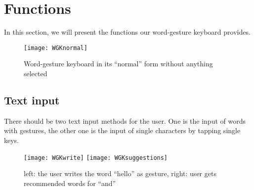 \section{Functions}
In this section, we will present the functions our word-gesture keyboard provides.
\begin{figure}
\centering
\texttt{[image: WGKnormal]}
\caption{Word-gesture keyboard in its ``normal'' form without anything selected}
\end{figure}
    
\subsection{Text input}
There should be two text input methods for the user. One is the input of words with gestures, the other one is the input of single characters by tapping single keys.

\begin{figure}
\centering
\texttt{[image: WGKwrite]}
\texttt{[image: WGKsuggestions]}
\caption{left: the user writes the word ``hello'' as gesture, right: user gets recommended words for ``and''}
\label{fig:write_suggestions}
\end{figure}

